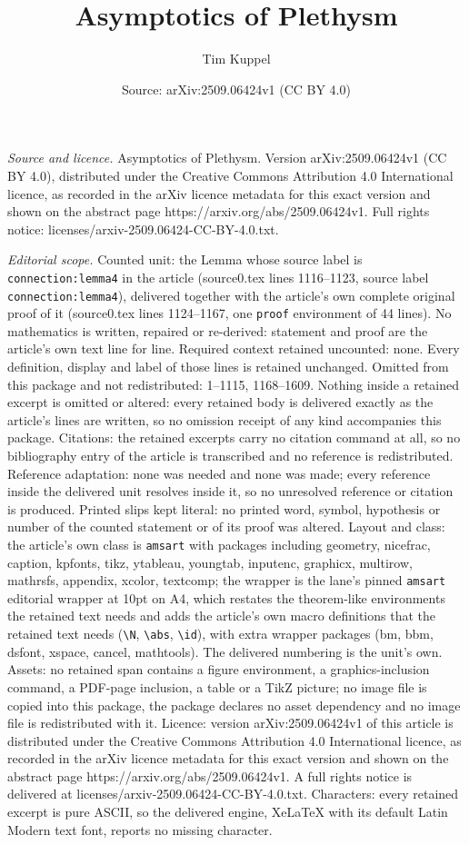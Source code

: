 \documentclass[10pt,a4paper]{amsart}
\title[Asymptotics of Plethysm]{Asymptotics of Plethysm}
\author{Tim Kuppel}
\date{Source: arXiv:2509.06424v1 (CC BY 4.0)}
\begin{document}
\maketitle

\noindent\emph{Source and licence.} Asymptotics of Plethysm. Version arXiv:2509.06424v1 (CC BY 4.0), distributed under the Creative Commons Attribution 4.0 International licence, as recorded in the arXiv licence metadata for this exact version and shown on the abstract page https://arxiv.org/abs/2509.06424v1. Full rights notice: licenses/arxiv-2509.06424-CC-BY-4.0.txt.\par\smallskip

\noindent\textit{Editorial scope.} Counted unit: the Lemma whose source label is \texttt{connection:lemma4} in the article (source0.tex lines 1116--1123, source label \texttt{connection:lemma4}), delivered together with the article's own complete original proof of it (source0.tex lines 1124--1167, one \texttt{proof} environment of 44 lines). No mathematics is written, repaired or re-derived: statement and proof are the article's own text line for line. Required context retained uncounted: none. Every definition, display and label of those lines is retained unchanged. Omitted from this package and not redistributed: 1--1115, 1168--1609. Nothing inside a retained excerpt is omitted or altered: every retained body is delivered exactly as the article's lines are written, so no omission receipt of any kind accompanies this package. Citations: the retained excerpts carry no citation command at all, so no bibliography entry of the article is transcribed and no reference is redistributed. Reference adaptation: none was needed and none was made; every reference inside the delivered unit resolves inside it, so no unresolved reference or citation is produced. Printed slips kept literal: no printed word, symbol, hypothesis or number of the counted statement or of its proof was altered. Layout and class: the article's own class is \texttt{amsart} with packages including geometry, nicefrac, caption, kpfonts, tikz, ytableau, youngtab, inputenc, graphicx, multirow, mathrsfs, appendix, xcolor, textcomp; the wrapper is the lane's pinned \texttt{amsart} editorial wrapper at 10pt on A4, which restates the theorem-like environments the retained text needs and adds the article's own macro definitions that the retained text needs (\texttt{\textbackslash N}, \texttt{\textbackslash abs}, \texttt{\textbackslash id}), with extra wrapper packages (bm, bbm, dsfont, xspace, cancel, mathtools). The delivered numbering is the unit's own. Assets: no retained span contains a figure environment, a graphics-inclusion command, a PDF-page inclusion, a table or a TikZ picture; no image file is copied into this package, the package declares no asset dependency and no image file is redistributed with it. Licence: version arXiv:2509.06424v1 of this article is distributed under the Creative Commons Attribution 4.0 International licence, as recorded in the arXiv licence metadata for this exact version and shown on the abstract page https://arxiv.org/abs/2509.06424v1. A full rights notice is delivered at licenses/arxiv-2509.06424-CC-BY-4.0.txt. Characters: every retained excerpt is pure ASCII, so the delivered engine, XeLaTeX with its default Latin Modern text font, reports no missing character.
\end{document}
